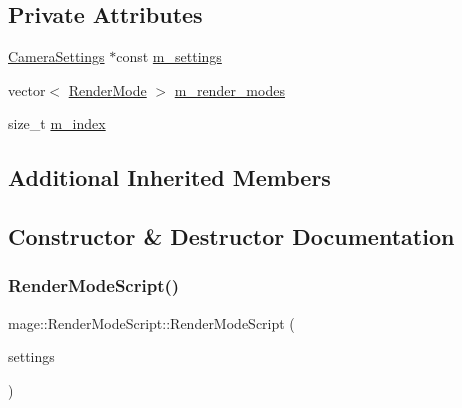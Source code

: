 \subsection*{Private Attributes}
\begin{DoxyCompactItemize}
\item 
\hyperlink{classmage_1_1_camera_settings}{Camera\+Settings} $\ast$const \hyperlink{classmage_1_1_render_mode_script_a536b13e61daa6faa3528f65d29fb252f}{m\+\_\+settings}
\item 
vector$<$ \hyperlink{namespacemage_a5e7e18b0154373ce8fc942fe3f6b27fd}{Render\+Mode} $>$ \hyperlink{classmage_1_1_render_mode_script_af9256e16f26574b138bf68f00951f702}{m\+\_\+render\+\_\+modes}
\item 
size\+\_\+t \hyperlink{classmage_1_1_render_mode_script_adf3d1adbc89db76d3541e0b7aed3b3dd}{m\+\_\+index}
\end{DoxyCompactItemize}
\subsection*{Additional Inherited Members}


\subsection{Constructor \& Destructor Documentation}
\hypertarget{classmage_1_1_render_mode_script_a313a1819a7d769199fe19a0573761e31}{}\label{classmage_1_1_render_mode_script_a313a1819a7d769199fe19a0573761e31} 
\subsubsection{\texorpdfstring{Render\+Mode\+Script()}{RenderModeScript()}\hspace{0.1cm}{\footnotesize\ttfamily [1/3]}}
{\footnotesize\ttfamily mage\+::\+Render\+Mode\+Script\+::\+Render\+Mode\+Script (\begin{DoxyParamCaption}\item[{\hyperlink{classmage_1_1_camera_settings}{Camera\+Settings} $\ast$}]{settings }\end{DoxyParamCaption})}

\hypertarget{classmage_1_1_render_mode_script_ac6b9d813ff57646b4bdcded5f1efdfb1}{}\label{classmage_1_1_render_mode_script_ac6b9d813ff57646b4bdcded5f1efdfb1} 
